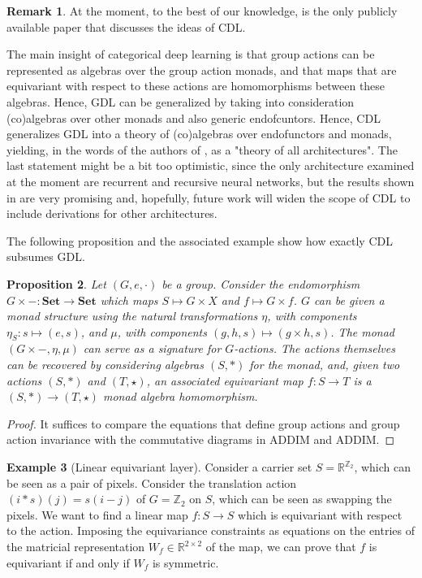 \documentclass[12pt,a4paper,openright,twoside]{report}
\theoremstyle{plain}
\newtheorem{proposition}{Proposition}
\theoremstyle{definition}
\newtheorem{remark}[proposition]{Remark}
\newtheorem{example}[proposition]{Example}
\begin{document}
\begin{remark}
  At the moment, to the best of our knowledge,  \cite{gavranovicposition} is the only publicly available paper that discusses the ideas of CDL. 
\end{remark}

The main insight of categorical deep learning is that group actions can be represented as algebras over the group action monads, and that maps that are equivariant with respect to these actions are homomorphisms between these algebras. Hence, GDL can be generalized by taking into consideration (co)algebras over other monads and also generic endofcuntors. Hence, CDL generalizes GDL into a theory of (co)algebras over endofunctors and monads, yielding, in the words of the authors of \cite{gavranovicposition}, as a "theory of all architectures". The last statement might be a bit too optimistic, since the only architecture examined at the moment are recurrent and recursive neural networks, but the results shown in \cite{gavranovicposition} are very promising and, hopefully, future work will widen the scope of CDL to include derivations for other architectures.

The following proposition and the associated example show how exactly CDL subsumes GDL.

\begin{proposition}
  Let $(G,e,\cdot)$ be a group. Consider the endomorphism $G \times -: \mathbf{Set} \to \mathbf{Set}$ which maps $S \mapsto G \times X$ and $f \mapsto G \times f$. $G$ can be given a monad structure using the natural transformations $\eta$, with components $\eta_S: s \mapsto (e,s)$, and $\mu$, with components $(g,h,s) \mapsto (g \times h, s)$. 
  The monad $(G \times -, \eta, \mu)$ can serve as a signature for $G$-actions. The actions themselves can be recovered by considering algebras $(S,\ast)$ for the monad, and, given two actions $(S,\ast)$ and $(T,\star)$, an associated equivariant map $f: S \to T$ is a $(S,\ast) \to (T,\star)$ monad algebra homomorphism.
\end{proposition}
\begin{proof}
  It suffices to compare the equations that define group actions and group action invariance with the commutative diagrams in ADDIM and ADDIM.
\end{proof}

\begin{example}[Linear equivariant layer]
  \label{ex: translationaction}
  Consider a carrier set $S = \mathbb{R}^{\mathbb{Z}_2}$, which can be seen as a pair of pixels. Consider the translation action $(i \ast s)(j) = s(i-j)$ of $G = \mathbb{Z}_2$ on $S$, which can be seen as swapping the pixels.
  We want to find a linear map $f: S \to S$ which is equivariant with respect to the action. Imposing the equivariance constraints as equations on the entries of the matricial representation $W_f \in \mathbb{R}^{2 \times 2}$ of the map, we can prove that $f$ is equivariant if and only if $W_f$ is symmetric.
\end{example}
\end{document}
